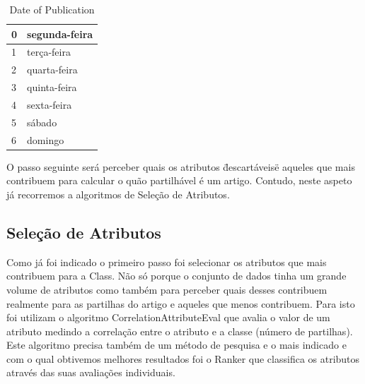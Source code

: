 \begin{table}[]
\centering
\label{my-labelOn2}
\caption{Date of Publication}
\begin{tabular}{|l|l|}
\hline
0 & segunda-feira \\ \hline
1 & terça-feira   \\ \hline
2 & quarta-feira  \\ \hline
3 & quinta-feira  \\ \hline
4 & sexta-feira   \\ \hline
5 & sábado        \\ \hline
6 & domingo       \\ \hline
\end{tabular}
\end{table}

O passo seguinte será perceber quais os atributos \"descartáveis\" e aqueles que mais contribuem para calcular o quão partilhável é um artigo. Contudo, neste aspeto já recorremos a algoritmos de Seleção de Atributos.

\subsection{Seleção de Atributos}

Como já foi indicado o primeiro passo foi selecionar os atributos que mais contribuem para a Class. Não só porque o conjunto de dados tinha um grande volume de atributos como também para perceber quais desses contribuem realmente para as partilhas do artigo e aqueles que menos contribuem. Para isto foi utilizam o algoritmo CorrelationAttributeEval que avalia o valor de um atributo medindo a correlação entre o atributo e a classe (número de partilhas). Este algoritmo precisa também de um método de pesquisa e o mais indicado e com o qual obtivemos melhores resultados foi o Ranker que classifica os atributos através das suas avaliações individuais.

